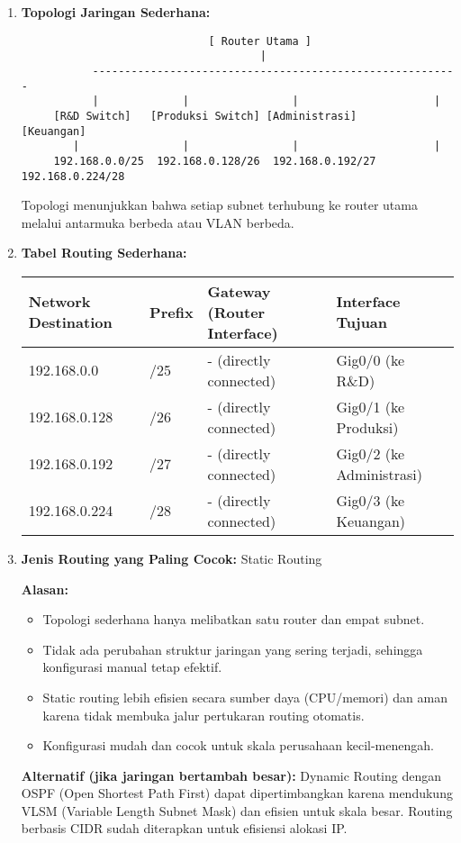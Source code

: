 \begin{enumerate}
    \item 
    \textbf{Topologi Jaringan Sederhana:}
    
    \begin{verbatim}
                             [ Router Utama ]
                                     |
           ---------------------------------------------------------
           |             |                |                     |
     [R&D Switch]   [Produksi Switch] [Administrasi]       [Keuangan]
        |                |                |                     |
     192.168.0.0/25  192.168.0.128/26  192.168.0.192/27    192.168.0.224/28
    \end{verbatim}
    
    Topologi menunjukkan bahwa setiap subnet terhubung ke router utama melalui antarmuka berbeda atau VLAN berbeda.

    \item 
    \textbf{Tabel Routing Sederhana:}
    
    \begin{center}
    \begin{tabular}{|l|l|l|l|}
    \hline
    \textbf{Network Destination} & \textbf{Prefix} & \textbf{Gateway (Router Interface)} & \textbf{Interface Tujuan} \\
    \hline
    192.168.0.0 & /25 & - (directly connected) & Gig0/0 (ke R\&D) \\
    192.168.0.128 & /26 & - (directly connected) & Gig0/1 (ke Produksi) \\
    192.168.0.192 & /27 & - (directly connected) & Gig0/2 (ke Administrasi) \\
    192.168.0.224 & /28 & - (directly connected) & Gig0/3 (ke Keuangan) \\
    \hline
    \end{tabular}
    \end{center}

    \item 
    \textbf{Jenis Routing yang Paling Cocok:}
	Static Routing
    
    \textbf{Alasan:}
    \begin{itemize}
        \item Topologi sederhana hanya melibatkan satu router dan empat subnet.
        \item Tidak ada perubahan struktur jaringan yang sering terjadi, sehingga konfigurasi manual tetap efektif.
        \item Static routing lebih efisien secara sumber daya (CPU/memori) dan aman karena tidak membuka jalur pertukaran routing otomatis.
        \item Konfigurasi mudah dan cocok untuk skala perusahaan kecil-menengah.
    \end{itemize}

    \textbf{Alternatif (jika jaringan bertambah besar):} Dynamic Routing dengan
	OSPF (Open Shortest Path First) dapat dipertimbangkan karena mendukung VLSM
	(Variable Length Subnet Mask) dan efisien untuk skala besar. Routing berbasis
	CIDR sudah diterapkan untuk efisiensi alokasi IP.
\end{enumerate}
